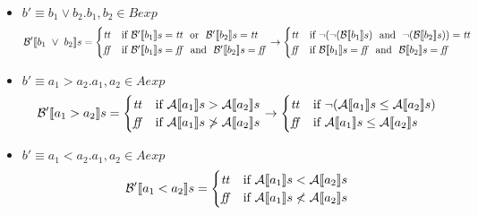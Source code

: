 \begin{enumerate}[label=(\alph*)]
\begin{itemize}
    \item $ b' \equiv b_1 \lor b_2. b_1, b_2 \in Bexp$ \\
      \begin{align*}  
        \Bext{b_1 \ \lor \ b_2} = 
        \begin{cases} 
        \semtrue & 
        \mbox{if} \ \Bext{b_1} = \semtrue \ \mbox{ or } \ 
              \Bext{b_2} = \semtrue \\ 
        \semfalse & 
        \mbox{if} \ \Bext{b_1} = \semfalse \ \mbox{ and } \ 
              \Bext{b_2} = \semfalse \\ 
        \end{cases} 
        \rightarrow
        \begin{cases} 
        \semtrue & 
        \mbox{if} \ \lnot (\lnot (\B{b_1}) \ \mbox{ and } \ 
              \lnot (\B{b_2})) = \semtrue \\ 
        \semfalse & 
        \mbox{if} \ \B{b_1} = \semfalse \ \mbox{ and } \ 
              \B{b_2} = \semfalse \\ 
        \end{cases}
      \end{align*}
    \item $ b' \equiv a_1 > a_2. a_1, a_2 \in Aexp$ \\
      \begin{align*} 
       \mathcal{B'} \llbracket a_1 > a_2 \rrbracket s = 
        \begin{cases} 
        \mbox{\textit{tt}} & 
        \mbox{if} \ \mathcal{A} \llbracket a_1 \rrbracket s > \mathcal{A} \llbracket a_2 \rrbracket s\\ 
        \mbox{\textit{ff}} & 
        \mbox{if} \ \mathcal{A} \llbracket a_1 \rrbracket s \not > \mathcal{A} \llbracket a_2 \rrbracket s\\
        \end{cases} 
        \rightarrow
        \begin{cases} 
        \mbox{\textit{tt}} & 
        \mbox{if} \ \lnot (\mathcal{A} \llbracket a_1 \rrbracket s \leq \mathcal{A} \llbracket a_2 \rrbracket s)\\ 
        \mbox{\textit{ff}} & 
        \mbox{if} \ \mathcal{A} \llbracket a_1 \rrbracket s \leq \mathcal{A} \llbracket a_2 \rrbracket s\\
        \end{cases} 
      \end{align*}
    \item $ b' \equiv a_1 < a_2. a_1, a_2 \in Aexp$ \\
      \begin{align*}
        \mathcal{B'} \llbracket a_1 < a_2 \rrbracket s = 
        \begin{cases} 
        \mbox{\textit{tt}} & 
        \mbox{if} \ \mathcal{A} \llbracket a_1 \rrbracket s < \mathcal{A} \llbracket a_2 \rrbracket s\\ 
        \mbox{\textit{ff}} & 
        \mbox{if} \ \mathcal{A} \llbracket a_1 \rrbracket s \not < \mathcal{A} \llbracket a_2 \rrbracket s\\

\end{cases}
\end{align*}
\end{itemize}
\end{enumerate}
